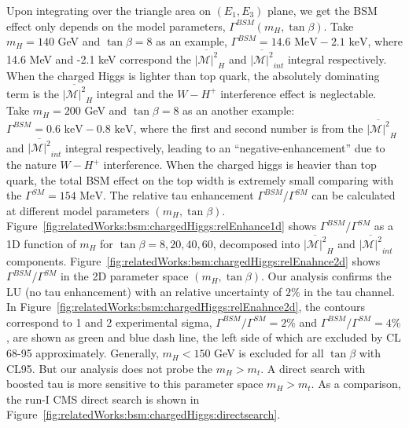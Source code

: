 \noindent Upon integrating over the triangle area on  $(E_1, E_3)$ plane, we get the BSM effect only depends on the model parameters, $\Gamma^{BSM} (m_H, \tan\beta)$. Take $m_H = 140 $ GeV and $\tan\beta=8$ as an example, $\Gamma^{BSM}= 14.6 \text{ MeV} - 2.1 \text{ keV}$, where 14.6 MeV and  -2.1 keV correspond the  $\overline{ |\mathcal{M}|^2 } _{H}$ and $\overline{ |\mathcal{M}|^2 } _{int}$ integral respectively. When the charged Higgs is  lighter than top quark, the absolutely dominating term is the $\overline{ |\mathcal{M}|^2 } _{H}$ integral and the $W-H^+$ interference effect is neglectable. Take $m_H = 200 $ GeV and $\tan\beta=8$ as an another example: $\Gamma^{BSM} = 0.6 \text{ keV} - 0.8 \text{ keV}$, where the first and second number is from the  $\overline{ |\mathcal{M}|^2 } _{H}$ and $\overline{ |\mathcal{M}|^2 } _{int}$ integral respectively, leading to an ``negative-enhancement'' due to the nature $W-H^+$ interference. When the charged higgs is heavier than top quark, the total BSM effect on the top width is extremely small comparing with the $\Gamma^{SM}= 154 \text{ MeV}$. The relative tau enhancement $\Gamma^{BSM}/\Gamma^{SM}$ can be calculated at different model parameters $(m_H, \tan\beta)$. Figure~\ref{fig:relatedWorks:bsm:chargedHiggs:relEnhance1d} shows  $\Gamma^{BSM}/\Gamma^{SM}$ as a 1D function of $m_H$ for $\tan\beta= 8,20,40,60$, decomposed into $\overline{ |\mathcal{M}|^2 } _{H}$ and $\overline{ |\mathcal{M}|^2 } _{int}$  components. Figure~\ref{fig:relatedWorks:bsm:chargedHiggs:relEnahnce2d} shows $\Gamma^{BSM}/\Gamma^{SM}$ in the 2D parameter space $(m_H, \tan\beta)$. Our analysis confirms the LU (no tau enhancement) with an relative uncertainty of $2\%$ in the tau channel. In  Figure~\ref{fig:relatedWorks:bsm:chargedHiggs:relEnahnce2d}, the contours correspond to 1 and 2 experimental sigma, $\Gamma^{BSM}/\Gamma^{SM} = 2\%$ and $\Gamma^{BSM}/\Gamma^{SM} = 4\%$, are shown as green and blue dash line, the left side of which are excluded by CL 68-95 approximately. Generally, $m_H < 150$ GeV is excluded for all $\tan\beta$ with CL95. But our analysis does not probe the $m_H >m_t$. A direct search with boosted tau is more sensitive to this parameter space $m_H >m_t$. As a comparison, the run-I CMS direct search \cite{Khachatryan:2015qxa} is shown in Figure~\ref{fig:relatedWorks:bsm:chargedHiggs:directsearch}.


